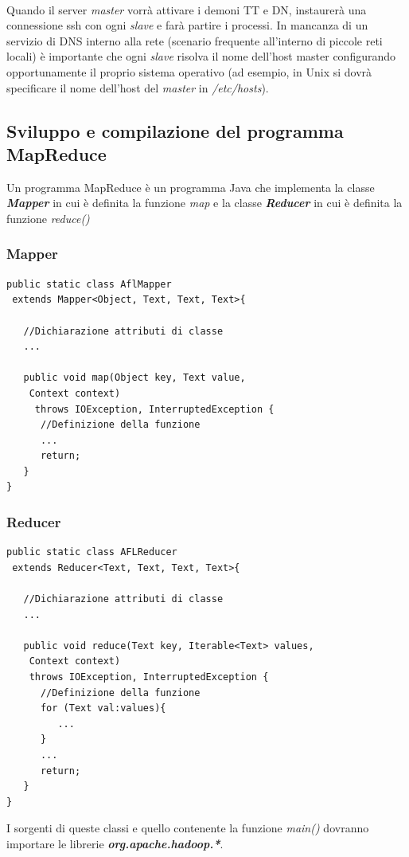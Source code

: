 \documentclass[a4paper,11pt]{report}
\begin{document}
\paragraph{}
Quando il server \emph{master} vorrà attivare i demoni TT e DN,
instaurerà una connessione ssh con ogni \emph{slave} e farà partire i processi. In mancanza di un servizio di DNS interno alla rete
(scenario frequente all'interno di piccole 
reti locali) è importante che ogni \emph{slave} risolva il nome dell'host master configurando opportunamente il proprio sistema operativo
(ad esempio, in Unix si dovrà specificare 
il nome dell'host del \emph{master} in \emph{/etc/hosts}). 

\subsection{Sviluppo e compilazione del programma MapReduce}
Un programma MapReduce è un programma Java che implementa la classe \emph{\textbf{Mapper}} in cui è definita la funzione \emph{map} e la
classe \emph{\textbf{Reducer}} in 
cui è definita la funzione \emph{reduce()}
\subsubsection{Mapper}
\begin{lstlisting}
public static class AflMapper 
 extends Mapper<Object, Text, Text, Text>{

   //Dichiarazione attributi di classe
   ...

   public void map(Object key, Text value, 
    Context context) 
     throws IOException, InterruptedException {
      //Definizione della funzione
      ...
      return;
   }
}
\end{lstlisting}
\paragraph{}
\subsubsection{Reducer}
\begin{lstlisting}
public static class AFLReducer 
 extends Reducer<Text, Text, Text, Text>{

   //Dichiarazione attributi di classe
   ...

   public void reduce(Text key, Iterable<Text> values, 
    Context context) 
    throws IOException, InterruptedException {   
      //Definizione della funzione
      for (Text val:values){
         ...
      }
      ...
      return;
   }
}
\end{lstlisting}
I sorgenti di queste classi e quello contenente la funzione \emph{main()} dovranno importare le librerie
\emph{\textbf{org.apache.hadoop.*}}.
\end{document}
